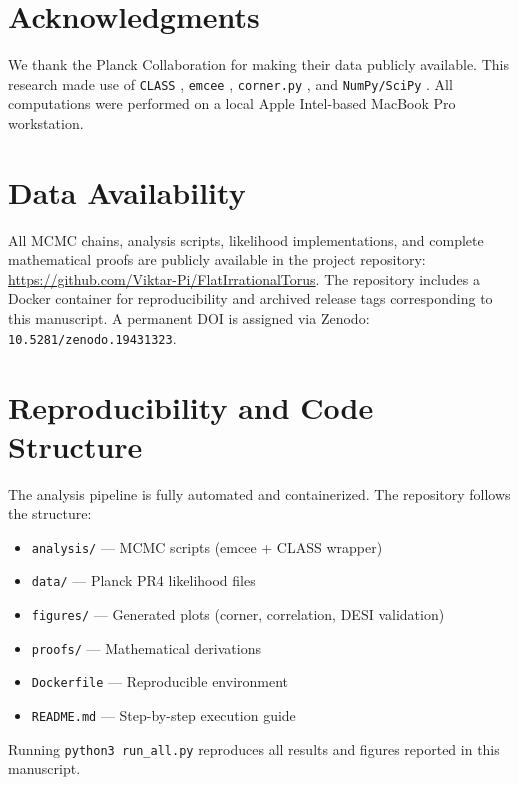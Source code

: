 \documentclass[a4paper,11pt]{article}
\begin{document}
\section*{Acknowledgments}

We thank the Planck Collaboration for making their data publicly available. This research made use of \texttt{CLASS} \citep{CLASS2011}, \texttt{emcee} \citep{emcee2013}, \texttt{corner.py} \citep{corner2016}, and \texttt{NumPy/SciPy} \citep{numpy,scipy}. All computations were performed on a local Apple Intel-based MacBook Pro workstation.

\section*{Data Availability}

All MCMC chains, analysis scripts, likelihood implementations, and complete mathematical proofs are publicly available in the project repository: \url{https://github.com/Viktar-Pi/FlatIrrationalTorus}. 
The repository includes a Docker container for reproducibility and archived release tags corresponding to this manuscript. 
A permanent DOI is assigned via Zenodo: \texttt{10.5281/zenodo.19431323}.




\appendix

\section{Reproducibility and Code Structure}

The analysis pipeline is fully automated and containerized. The repository follows the structure:

\begin{itemize}
    \item \texttt{analysis/} --- MCMC scripts (emcee + CLASS wrapper)
    \item \texttt{data/} --- Planck PR4 likelihood files
    \item \texttt{figures/} --- Generated plots (corner, correlation, DESI validation)
    \item \texttt{proofs/} --- Mathematical derivations
    \item \texttt{Dockerfile} --- Reproducible environment
    \item \texttt{README.md} --- Step-by-step execution guide
\end{itemize}

Running \texttt{python3 run\_all.py} reproduces all results and figures reported in this manuscript.
\end{document}

